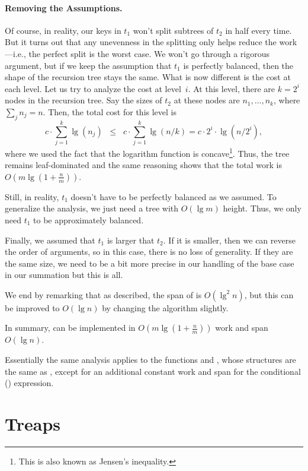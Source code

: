 \begin{chapter}
\paragraph{Removing the Assumptions.}

Of course, in reality, our keys in $t_1$ won't split subtrees of $t_2$
in half every time.  But it turns out that any unevenness in the
splitting only helps reduce the work---i.e., the perfect split is the
worst case.  We won't go through a rigorous argument, but if we keep
the assumption that $t_1$ is perfectly balanced, then the shape of the
recursion tree stays the same.  What is now different is the cost at
each level.  Let us try to analyze the cost at level~$i$.  At this
level, there are $k = 2^i$ nodes in the recursion tree. Say the sizes
of $t_2$ at these nodes are $n_1, \dots, n_k$, where $\sum_j n_j =
n$. Then, the total cost for this level is
\[
c \cdot \sum_{j=1}^k \lg (n_j) \;\;\leq\;\; c \cdot \sum_{j=1}^k \lg (n/k) =
c\cdot 2^i \cdot \lg (n/2^i),
\]
where we used the fact that the logarithm function is
concave\footnote{This is also known as Jensen's inequality.}.  Thus,
the tree remains leaf-dominated and the same reasoning shows that the
total work is $O(m \lg (1 + \frac{n}{m}))$.

Still, in reality, $t_1$ doesn't have to be perfectly balanced as we
assumed. To generalize the analysis, we just need a tree with
$O(\lg{m})$ height.  Thus, we only need $t_1$ to be approximately
balanced. 

Finally, we assumed that $t_1$ is larger that $t_2$.  If it is
smaller, then we can reverse the order of arguments, so in this case,
there is no loss of generality.  If they are the same size, we need to
be a bit more precise in our handling of the base case in our
summation but this is all.

We end by remarking that as described, the span of \cunion{} is
$O(\lg^2 n)$, but this can be improved to $O(\lg n)$ by changing the
algorithm slightly.

In summary, \cunion{} can be implemented in $O(m \lg (1 +
\tfrac{n}m))$ work and span $O(\lg n)$.  

Essentially the same analysis applies to the functions
 and , whose structures are the same
as , except for an additional constant work and span for
the conditional () expression.
 
\section{Treaps}
\label{sec:bst::treaps}


\end{chapter}
